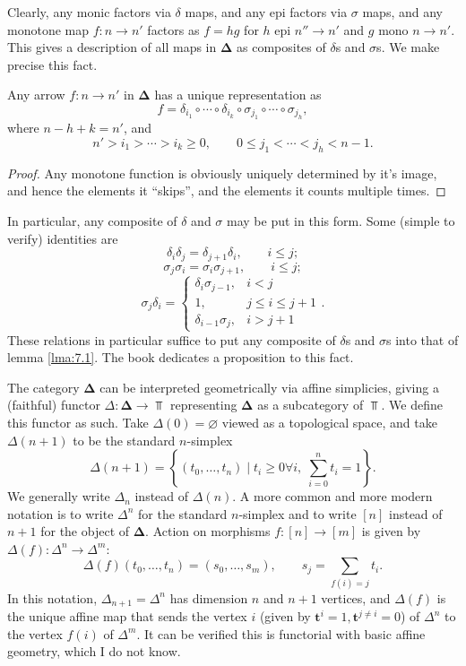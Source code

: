 Clearly, any monic factors via $\delta$ maps, and any epi factors via $\sigma$ maps, and any monotone map $f : n \to n'$ factors as $f=hg$ for $h$ epi $n''\to n'$ and $g$ mono $n\to n'$. This gives a description of all maps in $\boldsymbol{\Delta} $ as composites of $\delta$s and $\sigma$s. We make precise this fact.

\begin{lemma}\label{lma:7.1}
	Any arrow $f : n \to n'$ in $\boldsymbol{\Delta} $ has a unique representation as
	\[
		f=\delta_{i_1} \circ \cdots \circ \delta_{i_k} \circ \sigma_{j_1} \circ \cdots \circ \sigma_{j_h} 
	,\]
	where $n-h+k=n'$, and
	\[
		n'>i_1 > \cdots > i_k \geq 0,\qquad 0\leq j_1<\cdots<j_h<n-1
	.\]
\end{lemma}
\begin{proof}
	Any monotone function is obviously uniquely determined by it's image, and hence the elements it ``skips'', and the elements it counts multiple times.
\end{proof}

In particular, any composite of $\delta$ and $\sigma$ may be put in this form. Some (simple to verify) identities are
\[
	\delta_i\delta_j = \delta_{j+1} \delta_i,\qquad i\leq j
;\]
\[
	\sigma_j\sigma_i = \sigma_i\sigma_{j+1} ,\qquad i\leq j;
\]
\[
	\sigma_j\delta_i =
	\begin{cases}
		\delta_i\sigma_{j-1} ,&i<j\\
		1,&j\leq i\leq j+1\\
		\delta_{i-1} \sigma_j,&i>j+1
	\end{cases}.
\]
These relations in particular suffice to put any composite of $\delta$s and $\sigma$s into that of lemma \ref{lma:7.1}. The book dedicates a proposition to this fact.

The category $\boldsymbol{\Delta} $ can be interpreted geometrically via affine simplicies, giving a (faithful) functor $\Delta : \boldsymbol{\Delta}  \to \Top $ representing $\boldsymbol{\Delta} $ as a subcategory of $\Top $. We define this functor as such. Take $\Delta(0)=\varnothing $ viewed as a topological space, and take $\Delta(n+1)$ to be the standard $n$-simplex
\[
	\Delta(n+1)=\left\{ (t_0, \ldots ,t_n)\mid t_i\geq 0\forall i,\; \sum_{i=0}^n t_i=1 \right\} 
.\]
We generally write $\Delta_{n} $ instead of $\Delta(n)$. A more common and more modern notation is to write $\Delta^n$ for the standard $n$-simplex and to write $[n]$ instead of $n+1$ for the object of $\boldsymbol{\Delta} $. Action on morphisms $f : [n] \to [m]$ is given by $\Delta(f): \Delta^n \to \Delta^m$:
\[
	\Delta(f)(t_0, \ldots ,t_n)=(s_0, \ldots ,s_m),\qquad s_j = \sum_{f(i)=j} t_i
.\]
In this notation, $\Delta_{n+1} =\Delta^n$ has dimension $n$ and $n+1$ vertices, and $\Delta(f)$ is the unique affine map that sends the vertex $i$ (given by $\mathbf{t}^i=1,\mathbf{t}^{j\neq i} =0$) of $\Delta^n$ to the vertex $f(i)$ of $\Delta^m$. It can be verified this is functorial with basic affine geometry, which I do not know.

